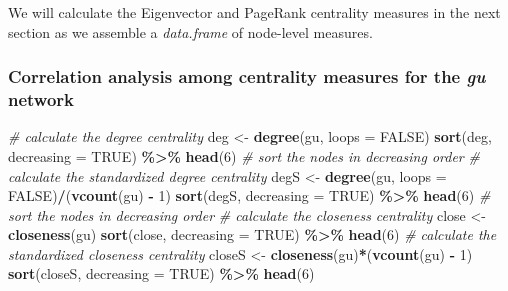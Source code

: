 \documentclass[
]{article}
\newenvironment{Shaded}{\begin{snugshade}}{\end{snugshade}}
\newcommand{\AttributeTok}[1]{\textcolor[rgb]{0.13,0.29,0.53}{#1}}
\newcommand{\CommentTok}[1]{\textcolor[rgb]{0.56,0.35,0.01}{\textit{#1}}}
\newcommand{\ConstantTok}[1]{\textcolor[rgb]{0.56,0.35,0.01}{#1}}
\newcommand{\DecValTok}[1]{\textcolor[rgb]{0.00,0.00,0.81}{#1}}
\newcommand{\FunctionTok}[1]{\textcolor[rgb]{0.13,0.29,0.53}{\textbf{#1}}}
\newcommand{\NormalTok}[1]{#1}
\newcommand{\OtherTok}[1]{\textcolor[rgb]{0.56,0.35,0.01}{#1}}
\newcommand{\SpecialCharTok}[1]{\textcolor[rgb]{0.81,0.36,0.00}{\textbf{#1}}}
\begin{document}
We will calculate the Eigenvector and PageRank centrality measures in the next section as we assemble a \emph{data.frame} of node-level measures.

\hypertarget{correlation-analysis-among-centrality-measures-for-the-gu-network}{%
\subsubsection{\texorpdfstring{Correlation analysis among centrality measures for the \emph{gu} network}{Correlation analysis among centrality measures for the gu network}}\label{correlation-analysis-among-centrality-measures-for-the-gu-network}}

\footnotesize

\begin{Shaded}
\begin{Highlighting}[]
\CommentTok{\# calculate the degree centrality}
\NormalTok{deg }\OtherTok{\textless{}{-}} \FunctionTok{degree}\NormalTok{(gu, }\AttributeTok{loops =} \ConstantTok{FALSE}\NormalTok{)}
\FunctionTok{sort}\NormalTok{(deg, }\AttributeTok{decreasing =} \ConstantTok{TRUE}\NormalTok{) }\SpecialCharTok{\%\textgreater{}\%} \FunctionTok{head}\NormalTok{(}\DecValTok{6}\NormalTok{) }\CommentTok{\# sort the nodes in decreasing order}
\CommentTok{\# calculate the standardized degree centrality}
\NormalTok{degS }\OtherTok{\textless{}{-}} \FunctionTok{degree}\NormalTok{(gu, }\AttributeTok{loops =} \ConstantTok{FALSE}\NormalTok{)}\SpecialCharTok{/}\NormalTok{(}\FunctionTok{vcount}\NormalTok{(gu) }\SpecialCharTok{{-}} \DecValTok{1}\NormalTok{)}
\FunctionTok{sort}\NormalTok{(degS, }\AttributeTok{decreasing =} \ConstantTok{TRUE}\NormalTok{) }\SpecialCharTok{\%\textgreater{}\%} \FunctionTok{head}\NormalTok{(}\DecValTok{6}\NormalTok{) }\CommentTok{\# sort the nodes in decreasing order}
\CommentTok{\# calculate the closeness centrality}
\NormalTok{close }\OtherTok{\textless{}{-}} \FunctionTok{closeness}\NormalTok{(gu)}
\FunctionTok{sort}\NormalTok{(close, }\AttributeTok{decreasing =} \ConstantTok{TRUE}\NormalTok{) }\SpecialCharTok{\%\textgreater{}\%} \FunctionTok{head}\NormalTok{(}\DecValTok{6}\NormalTok{)}
\CommentTok{\# calculate the standardized closeness centrality}
\NormalTok{closeS }\OtherTok{\textless{}{-}} \FunctionTok{closeness}\NormalTok{(gu)}\SpecialCharTok{*}\NormalTok{(}\FunctionTok{vcount}\NormalTok{(gu) }\SpecialCharTok{{-}} \DecValTok{1}\NormalTok{)}
\FunctionTok{sort}\NormalTok{(closeS, }\AttributeTok{decreasing =} \ConstantTok{TRUE}\NormalTok{) }\SpecialCharTok{\%\textgreater{}\%} \FunctionTok{head}\NormalTok{(}\DecValTok{6}\NormalTok{)}

\end{Highlighting}
\end{Shaded}
\end{document}
